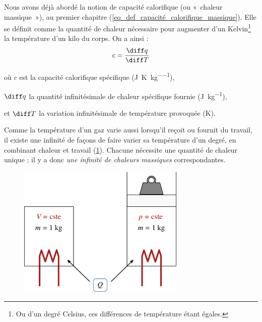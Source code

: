 		Nous avons déjà abordé la notion de capacité calorifique (ou «~chaleur massique~»), au premier chapitre (\ref{eq_def_capacité_calorifique_massique}). Elle se définit comme la quantité de chaleur nécessaire pour augmenter d’un Kelvin\footnote{Ou d’un degré Celsius, ces différences de température étant égales.}
		la température d’un kilo du corps. On a ainsi :
		\begin{equation}
			c = \frac{\diff q}{\diff T}
		\end{equation}
		\begin{equationterms}
			\item où \tab $c$ 		\tab\tab est la capacité calorifique spécifique (\si{\joule\per\kelvin\per\kilogram}),
			\item 	\tab $\diff q$ \tab la quantité infinitésimale de chaleur spécifique fournie (\si{\joule\per\kilogram}),
			\item et \tab $\diff T$ \tab la variation infinitésimale de température provoquée (\si{\kelvin}).
		\end{equationterms}

		Comme la température d’un gaz varie aussi lorsqu’il reçoit ou fournit du travail, il existe une infinité de façons de faire varier sa température d’un degré, en combinant chaleur et travail (\cref{fig_expérience_diff_chaleurs_massiques}). Chacune nécessite une quantité de chaleur unique ; il y a donc \textit{une infinité de chaleurs massiques} correspondantes.

		\begin{figure}
			\begin{center}
				\includegraphics[width=8cm]{images/difference_capacites_calorifiques.png}
			\end{center}
			\label{fig_expérience_diff_chaleurs_massiques}
		\end{figure}

